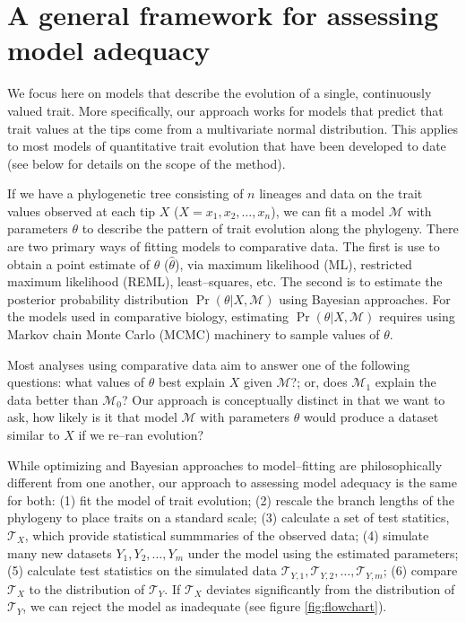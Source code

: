 \documentclass[a4paper,11pt]{article}
\begin{document}
\section{A general framework for assessing model adequacy}

We focus here on models that describe the evolution of a single, continuously valued trait. More specifically, our approach works for models that predict that trait values at the tips come from a multivariate normal distribution. This applies to most models of quantitative trait evolution that have been developed to date (see below for details on the scope of the method).

If we have a phylogenetic tree consisting of $n$ lineages and data on the trait values observed at each tip $X$ ($X=x_1, x_2, \ldots, x_n$), we can fit a model $\mathcal{M}$ with parameters $\theta$ to describe the pattern of trait evolution along the phylogeny. There are two primary ways of fitting models to comparative data. The first is use to obtain a point estimate of $\theta$ ($\hat \theta$), via maximum likelihood (ML), restricted maximum likelihood (REML), least--squares, etc. The second is to estimate the posterior probability distribution $\Pr(\theta|X, \mathcal{M})$ using Bayesian approaches.
For the models used in comparative biology, estimating $\Pr(\theta|X, \mathcal{M})$ requires using Markov chain Monte Carlo (MCMC) machinery to sample values of $\theta$.

Most analyses using comparative data aim to answer one of the following questions: what values of $\theta$ best explain $X$ given $\mathcal{M}$?; or, does $\mathcal{M}_1$ explain the data better than $\mathcal{M}_0$? 
Our approach is conceptually distinct in that we want to ask, how likely is it that model $\mathcal{M}$ with parameters $\theta$ would produce a dataset similar to $X$ if we re--ran evolution?   

While optimizing and Bayesian approaches to model--fitting are philosophically different from one another, our approach to assessing model adequacy is the same for both: (1) fit the model of trait evolution; (2) rescale the branch lengths of the phylogeny to place traits on a standard scale; (3) calculate a set of test statitics, $\mathcal{T}_X$, which provide statistical summmaries of the observed data; (4) simulate many new datasets $Y_1, Y_2, \ldots, Y_m$ under the model using the estimated parameters; (5) calculate test statistics on the simulated data $\mathcal{T}_{Y,1}, \mathcal{T}_{Y,2}, \ldots, \mathcal{T}_{Y,m}$; (6) compare $\mathcal{T}_X$ to the distribution of $\mathcal{T}_Y$. If $\mathcal{T}_X$ deviates significantly from the distribution of $\mathcal{T}_Y$, we can reject the model as inadequate (see figure \ref{fig:flowchart}).
\end{document}
